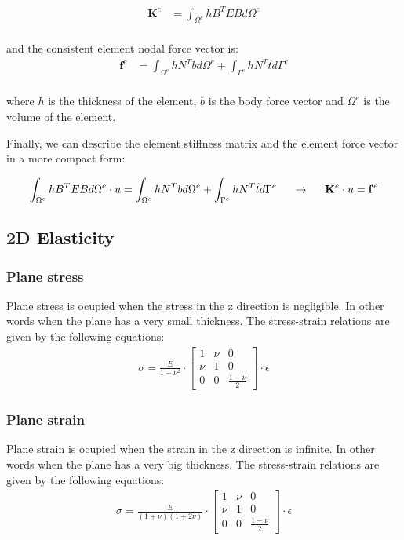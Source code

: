 \documentclass{article}  %
\begin{document}
\begin{align}
  \mathbf{K}^e &= \int_{\Omega^e} h B^T E B d\Omega^e \\
\end{align}

and the consistent element nodal force vector is:
\begin{align}
  \mathbf{f}^e &= \int_{\Omega^e} h N^T b d\Omega^e +  \int_{\Gamma^e} h N^T \hat{t} d\Gamma^e\\
\end{align}

where $h$ is the thickness of the element, $b$ is the body force vector and $\Omega^e$ is the volume of the element.

Finally, we can describe the element stiffness matrix and the element force vector in a more compact form:

\begin{align}
  \int_{\Omega^e} h B^T E B d\Omega^e \cdot u = \int_{\Omega^e} h N^T b d\Omega^e +  \int_{\Gamma^e} h N^T \hat{t} d\Gamma^e \hspace{0.5cm} \rightarrow \hspace{0.5cm} \mathbf{K}^e \cdot u = \mathbf{f}^e
\end{align}

\subsection{2D Elasticity}
\subsubsection{Plane stress}
Plane stress is ocupied when the stress in the z direction is negligible. In other words when the plane has a very small thickness. The stress-strain relations are given by the following equations:
\begin{align} 
  \sigma = \frac{E}{1-\nu^2} \cdot 
  \begin{bmatrix}
    1 & \nu & 0 \\
    \nu & 1 & 0 \\
    0 & 0 & \frac{1-\nu}{2}
  \end{bmatrix}
  \cdot \epsilon
\end{align}

\subsubsection{Plane strain}
Plane strain is ocupied when the strain in the z direction is infinite. In other words when the plane has a very big thickness. The stress-strain relations are given by the following equations:
\begin{align} 
  \sigma = \frac{E}{(1+\nu)(1+2 \nu)} \cdot 
  \begin{bmatrix}
    1 & \nu & 0 \\
    \nu & 1 & 0 \\
    0 & 0 & \frac{1-\nu}{2}
  \end{bmatrix}
  \cdot \epsilon
\end{align}
\end{document}
